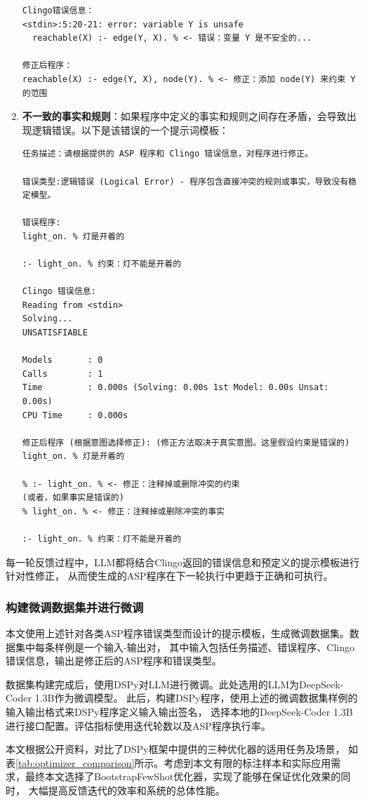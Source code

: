 \begin{enumerate}[itemsep=0pt,parsep=0pt]
\begin{lstlisting}
Clingo错误信息：
<stdin>:5:20-21: error: variable Y is unsafe
  reachable(X) :- edge(Y, X). % <- 错误：变量 Y 是不安全的...

修正后程序：
reachable(X) :- edge(Y, X), node(Y). % <- 修正：添加 node(Y) 来约束 Y 的范围
\end{lstlisting}
\item \textbf{不一致的事实和规则}：如果程序中定义的事实和规则之间存在矛盾，会导致出现逻辑错误。以下是该错误的一个提示词模板：
\begin{lstlisting}
任务描述：请根据提供的 ASP 程序和 Clingo 错误信息，对程序进行修正。

错误类型:逻辑错误 (Logical Error) - 程序包含直接冲突的规则或事实，导致没有稳定模型。

错误程序:
light_on. % 灯是开着的

:- light_on. % 约束：灯不能是开着的

Clingo 错误信息:
Reading from <stdin>
Solving...
UNSATISFIABLE

Models       : 0
Calls        : 1
Time         : 0.000s (Solving: 0.00s 1st Model: 0.00s Unsat: 0.00s)
CPU Time     : 0.000s

修正后程序 (根据意图选择修正): (修正方法取决于真实意图。这里假设约束是错误的)
light_on. % 灯是开着的

% :- light_on. % <- 修正：注释掉或删除冲突的约束
(或者，如果事实是错误的)
% light_on. % <- 修正：注释掉或删除冲突的事实

:- light_on. % 约束：灯不能是开着的
\end{lstlisting}
\end{enumerate}
每一轮反馈过程中，LLM都将结合Clingo返回的错误信息和预定义的提示模板进行针对性修正，
从而使生成的ASP程序在下一轮执行中更趋于正确和可执行。

\subsubsection{构建微调数据集并进行微调}
本文使用上述针对各类ASP程序错误类型而设计的提示模板，生成微调数据集。数据集中每条样例是一个输入-输出对，
其中输入包括任务描述、错误程序、Clingo错误信息，输出是修正后的ASP程序和错误类型。

数据集构建完成后，使用DSPy对LLM进行微调。此处选用的LLM为DeepSeek-Coder 1.3B作为微调模型。
此后，构建DSPy程序，使用上述的微调数据集样例的输入输出格式来DSPy程序定义输入输出签名，
选择本地的DeepSeek-Coder 1.3B进行接口配置。评估指标使用迭代轮数以及ASP程序执行率。

本文根据公开资料，对比了DSPy框架中提供的三种优化器的适用任务及场景，
如表\ref{tab:optimizer_comparison}所示。考虑到本文有限的标注样本和实际应用需求，最终本文选择了BootstrapFewShot优化器，实现了能够在保证优化效果的同时，
大幅提高反馈迭代的效率和系统的总体性能。

